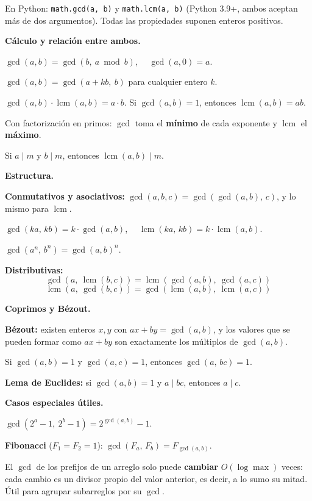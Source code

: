 En Python: \texttt{math.gcd(a, b)} y \texttt{math.lcm(a, b)} (Python 3.9+, ambos aceptan más de dos argumentos). Todas las propiedades suponen enteros positivos.

\textbf{Cálculo y relación entre ambos.}
\begin{props}
  \item \(\gcd(a,b) = \gcd(b,\ a \bmod b)\), \(\quad \gcd(a,0) = a\).
  \item \(\gcd(a,b) = \gcd(a + kb,\ b)\) para cualquier entero \(k\).
  \item \(\gcd(a,b) \cdot \operatorname{lcm}(a,b) = a \cdot b\). Si \(\gcd(a,b)=1\), entonces \(\operatorname{lcm}(a,b) = ab\).
  \item Con factorización en primos: \(\gcd\) toma el \textbf{mínimo} de cada exponente y \(\operatorname{lcm}\) el \textbf{máximo}.
  \item Si \(a \mid m\) y \(b \mid m\), entonces \(\operatorname{lcm}(a,b) \mid m\).
\end{props}

\textbf{Estructura.}
\begin{props}
  \item \textbf{Conmutativos y asociativos:} \(\gcd(a,b,c) = \gcd(\gcd(a,b),\,c)\), y lo mismo para \(\operatorname{lcm}\).
  \item \(\gcd(ka,\,kb) = k \cdot \gcd(a,b)\), \(\quad \operatorname{lcm}(ka,\,kb) = k \cdot \operatorname{lcm}(a,b)\).
  \item \(\gcd(a^n,\, b^n) = \gcd(a,b)^n\).
  \item \textbf{Distributivas:}
  \[\gcd(a,\ \operatorname{lcm}(b,c)) = \operatorname{lcm}(\gcd(a,b),\ \gcd(a,c))\]
  \[\operatorname{lcm}(a,\ \gcd(b,c)) = \gcd(\operatorname{lcm}(a,b),\ \operatorname{lcm}(a,c))\]
\end{props}

\textbf{Coprimos y Bézout.}
\begin{props}
  \item \textbf{Bézout:} existen enteros \(x, y\) con \(ax + by = \gcd(a,b)\), y los valores que se pueden formar como \(ax + by\) son exactamente los múltiplos de \(\gcd(a,b)\).
  \item Si \(\gcd(a,b) = 1\) y \(\gcd(a,c) = 1\), entonces \(\gcd(a,\, bc) = 1\).
  \item \textbf{Lema de Euclides:} si \(\gcd(a,b)=1\) y \(a \mid bc\), entonces \(a \mid c\).
\end{props}

\textbf{Casos especiales útiles.}
\begin{props}
  \item \(\gcd(2^a - 1,\ 2^b - 1) = 2^{\gcd(a,b)} - 1\).
  \item \textbf{Fibonacci} (\(F_1 = F_2 = 1\)): \(\gcd(F_a,\, F_b) = F_{\gcd(a,b)}\).
  \item El \(\gcd\) de los prefijos de un arreglo solo puede \textbf{cambiar} \(O(\log \max)\) veces: cada cambio es un divisor propio del valor anterior, es decir, a lo sumo su mitad. Útil para agrupar subarreglos por su \(\gcd\).
\end{props}
